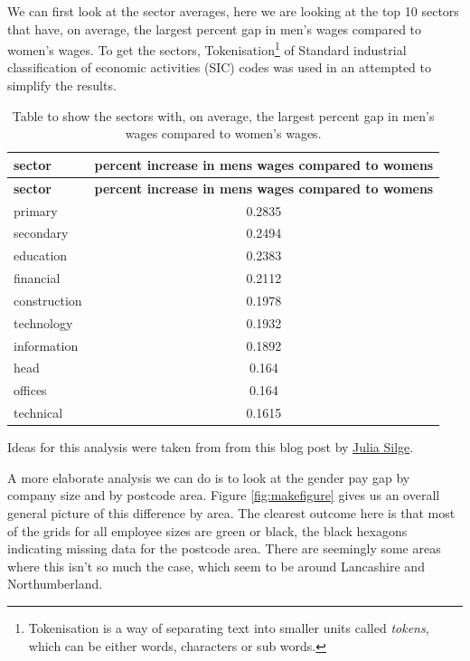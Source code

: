 \documentclass[
  11pt,
]{article}
\begin{document}
We can first look at the sector averages, here we are looking at the top
10 sectors that have, on average, the largest percent gap in men's wages
compared to women's wages. To get the sectors, Tokenisation\footnote{Tokenisation
  is a way of separating text into smaller units called \emph{tokens},
  which can be either words, characters or sub words.} of Standard
industrial classification of economic activities (SIC) codes was used in
an attempted to simplify the results.

\begin{longtable}[]{@{}lc@{}}
\caption{Table to show the sectors with, on average, the largest percent
gap in men's wages compared to women's wages.}\tabularnewline
\toprule()
\textbf{sector} & \textbf{percent increase in mens wages compared to
womens} \\
\midrule()
\endfirsthead
\toprule()
\textbf{sector} & \textbf{percent increase in mens wages compared to
womens} \\
\midrule()
\endhead
primary & 0.2835 \\
secondary & 0.2494 \\
education & 0.2383 \\
financial & 0.2112 \\
construction & 0.1978 \\
technology & 0.1932 \\
information & 0.1892 \\
head & 0.164 \\
offices & 0.164 \\
technical & 0.1615 \\
\bottomrule()
\end{longtable}

Ideas for this analysis were taken from from this blog post by
\href{https://juliasilge.com/blog/pay-gap-uk/}{Julia Silge}.

A more elaborate analysis we can do is to look at the gender pay gap by
company size and by postcode area. Figure \ref{fig:makefigure} gives us
an overall general picture of this difference by area. The clearest
outcome here is that most of the grids for all employee sizes are green
or black, the black hexagons indicating missing data for the postcode
area. There are seemingly some areas where this isn't so much the case,
which seem to be around Lancashire and Northumberland.
\end{document}
